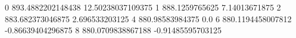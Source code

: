 0 893.4882202148438 12.50238037109375
1 888.1259765625 7.14013671875
2 883.682373046875 2.696533203125
4 880.98583984375 0.0
6 880.1194458007812 -0.86639404296875
8 880.0709838867188 -0.91485595703125
